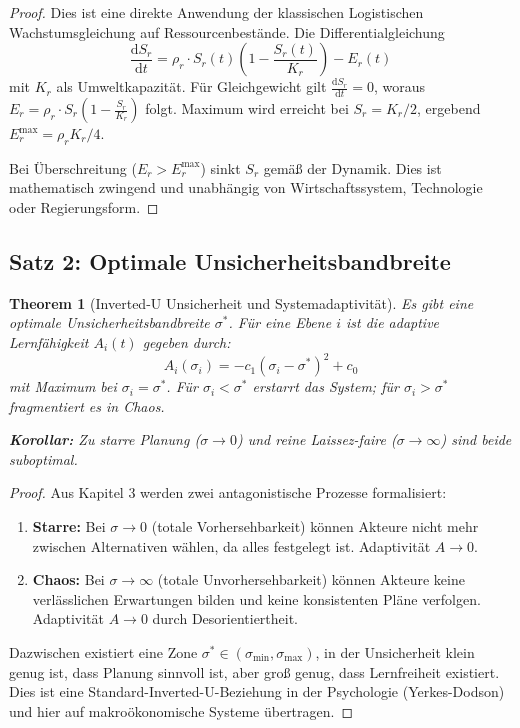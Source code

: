 \documentclass[a4paper, 12pt, twoside, openright]{report}
\newtheorem{theorem}{Theorem}[section]
\theoremstyle{definition}
\theoremstyle{definition}
\begin{document}
\begin{proof}
Dies ist eine direkte Anwendung der klassischen Logistischen Wachstumsgleichung auf Ressourcenbestände. Die Differentialgleichung
\begin{equation}
\frac{\mathrm{d}S_r}{\mathrm{d}t} = \rho_r \cdot S_r(t) \left(1 - \frac{S_r(t)}{K_r}\right) - E_r(t)
\end{equation}
mit $K_r$ als Umweltkapazität. Für Gleichgewicht gilt $\frac{\mathrm{d}S_r}{\mathrm{d}t} = 0$, woraus $E_r = \rho_r \cdot S_r(1 - \frac{S_r}{K_r})$ folgt. Maximum wird erreicht bei $S_r = K_r/2$, ergebend $E_r^{\max} = \rho_r K_r / 4$.

Bei Überschreitung ($E_r > E_r^{\max}$) sinkt $S_r$ gemäß der Dynamik. Dies ist mathematisch zwingend und unabhängig von Wirtschaftssystem, Technologie oder Regierungsform.
\end{proof}

\subsection{Satz 2: Optimale Unsicherheitsbandbreite}

\begin{theorem}[Inverted-U Unsicherheit und Systemadaptivität]
\label{thm:unsicherheit-optimalitaet}
Es gibt eine optimale Unsicherheitsbandbreite $\sigma^*$. Für eine Ebene $i$ ist die adaptive Lernfähigkeit $A_i(t)$ gegeben durch:
\begin{equation}
A_i(\sigma_i) = -c_1(\sigma_i - \sigma^*)^2 + c_0
\end{equation}
mit Maximum bei $\sigma_i = \sigma^*$. Für $\sigma_i < \sigma^*$ erstarrt das System; für $\sigma_i > \sigma^*$ fragmentiert es in Chaos.

\textbf{Korollar:} Zu starre Planung ($\sigma \to 0$) und reine Laissez-faire ($\sigma \to \infty$) sind beide suboptimal.
\end{theorem}

\begin{proof}
Aus Kapitel 3 werden zwei antagonistische Prozesse formalisiert:
\begin{enumerate}
\item \textbf{Starre:} Bei $\sigma \to 0$ (totale Vorhersehbarkeit) können Akteure nicht mehr zwischen Alternativen wählen, da alles festgelegt ist. Adaptivität $A \to 0$.
\item \textbf{Chaos:} Bei $\sigma \to \infty$ (totale Unvorhersehbarkeit) können Akteure keine verlässlichen Erwartungen bilden und keine konsistenten Pläne verfolgen. Adaptivität $A \to 0$ durch Desorientiertheit.
\end{enumerate}

Dazwischen existiert eine Zone $\sigma^* \in (\sigma_{\min}, \sigma_{\max})$, in der Unsicherheit klein genug ist, dass Planung sinnvoll ist, aber groß genug, dass Lernfreiheit existiert. Dies ist eine Standard-Inverted-U-Beziehung in der Psychologie (Yerkes-Dodson) und hier auf makroökonomische Systeme übertragen.
\end{proof}
\end{document}
